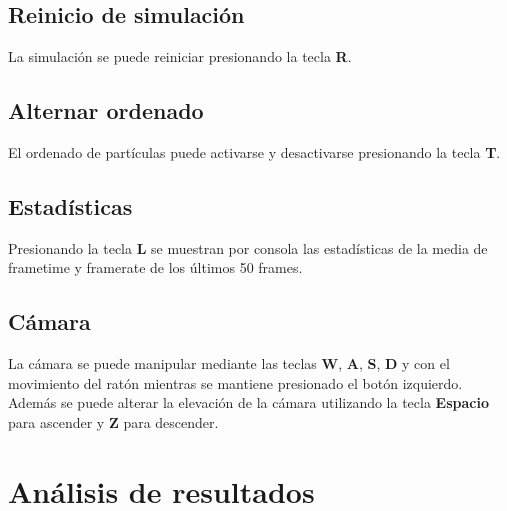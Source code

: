 \documentclass[10pt,oneside,a4paper]{article}
\begin{document}
\subsection{Reinicio de simulación}
La simulación se puede reiniciar presionando la tecla \textbf{R}.

\subsection{Alternar ordenado}
El ordenado de partículas puede activarse y desactivarse presionando la tecla \textbf{T}.

\subsection{Estadísticas}
Presionando la tecla \textbf{L} se muestran por consola las estadísticas de la media de frametime y framerate de los últimos 50 frames.

\subsection{Cámara}
La cámara se puede manipular mediante las teclas \textbf{W}, \textbf{A}, \textbf{S}, \textbf{D} y con el movimiento del ratón mientras se mantiene presionado el botón izquierdo. Además se puede alterar la elevación de la cámara utilizando la tecla \textbf{Espacio} para ascender y \textbf{Z} para descender.

\section{Análisis de resultados}
\end{document}
